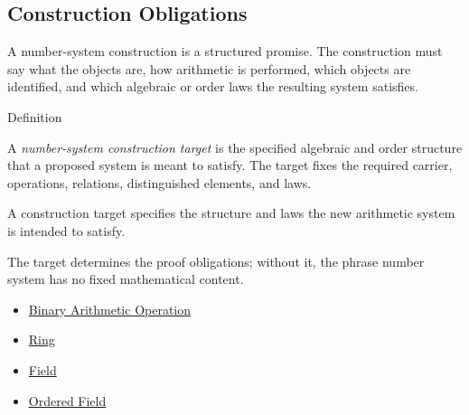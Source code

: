 \subsection*{Construction Obligations}

\begin{remark*}[Exposition]
A number-system construction is a structured promise. The construction must
say what the objects are, how arithmetic is performed, which objects are
identified, and which algebraic or order laws the resulting system satisfies.
\end{remark*}

\begin{definitionbox}{Definition}
\begin{definition}
\label{def:number-system-construction-target}
A \emph{number-system construction target} is the specified algebraic and
order structure that a proposed system is meant to satisfy. The target fixes
the required carrier, operations, relations, distinguished elements, and laws.
\end{definition}

\begin{remark*}
A construction target specifies the structure and laws the new arithmetic
system is intended to satisfy.
\end{remark*}

\begin{remark*}[Interpretation]
The target determines the proof obligations; without it, the phrase number
system has no fixed mathematical content.
\end{remark*}
\end{definitionbox}

\begin{dependencies}
\begin{itemize}
  \item \hyperref[def:binary-arithmetic-operation]{Binary Arithmetic Operation}
  \item \hyperref[def:ring]{Ring}
  \item \hyperref[def:abstract-field]{Field}
  \item \hyperref[def:abstract-ordered-field]{Ordered Field}
\end{itemize}
\end{dependencies}

